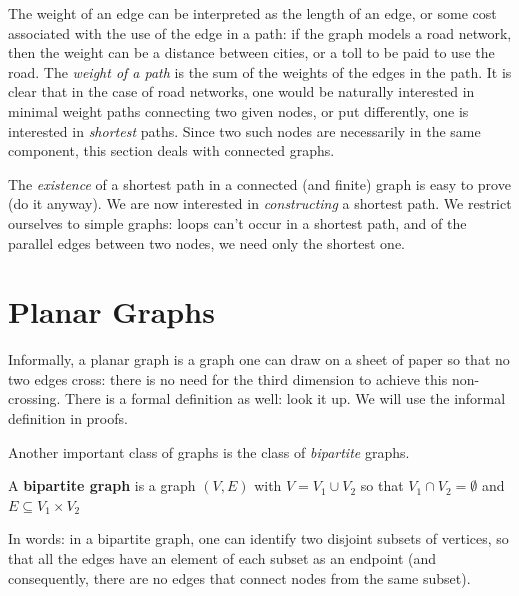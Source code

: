 The weight of an edge can be interpreted as the length of an
edge, or some cost associated with the use of the edge in a path: if
the graph models a road network, then the weight can be a distance
between cities, or a toll to be paid to use the road. The {\em weight
of a path} is the sum of the weights of the edges in the path. It is
clear that in the case of road networks, one would be naturally
interested in minimal weight paths connecting two given nodes, or put
differently, one is interested in {\em shortest} paths. Since two such
nodes are necessarily in the same component, this section deals with
connected graphs.

The {\em existence} of a shortest path in a connected (and finite)
graph is easy to prove (do it anyway). We are now interested in {\em
constructing} a shortest path. We restrict ourselves to simple graphs:
loops can't occur in a shortest path, and of the parallel edges
between two nodes, we need only the shortest one.



\section{Planar Graphs}

Informally, a planar graph is a graph one can draw on a sheet of
paper so that no two edges cross: there is no need for the third
dimension to achieve this non-crossing. There is a formal definition
as well: look it up. We will use the informal definition in proofs.

Another important class of graphs is the class of {\em bipartite}
graphs.

 \begin{definition}
  \textup{A \textbf{bipartite graph} is a graph $(V,E)$ with $V =
V_{1} \cup V_{2}$ so that $V_{1} \cap V_{2} = \emptyset$ and $E
\subseteq V_{1} \times V_{2}$ }
\end{definition}

In words: in a bipartite graph, one can identify two disjoint subsets
of vertices, so that all the edges have an element of each subset as
an endpoint (and consequently, there are no edges that connect nodes
from the same subset).

